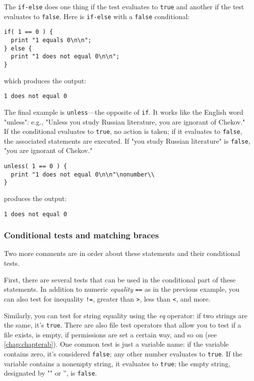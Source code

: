 The \verb|if-else| does one thing if the test evaluates to \verb|true| and another if the test evaluates to \verb|false|. Here is \verb|if-else| with a \verb|false| conditional: 

\begin{lstlisting}
if( 1 == 0 ) {
  print "1 equals 0\n\n";
} else {
  print "1 does not equal 0\n\n";
}
\end{lstlisting}

which produces the output:

\begin{lstlisting}
1 does not equal 0
\end{lstlisting}

The final example is \verb|unless|—the opposite of \verb|if|. It works like the English word "unless": e.g., "Unless you study Russian literature, you are ignorant of Chekov." If the conditional evaluates to \verb|true|, no action is taken; if it evaluates to \verb|false|, the associated statements are executed. If "you study Russian literature" is \verb|false|, "you are ignorant of Chekov." 

\begin{lstlisting}
unless( 1 == 0 ) {
  print "1 does not equal 0\n\n"\nonumber\\
}
\end{lstlisting}

produces the output:

\begin{lstlisting}
1 does not equal 0
\end{lstlisting}

\subsubsection{Conditional tests and matching braces}
Two more comments are in order about these statements and their conditional tests.

First, there are several tests that can be used in the conditional part of these statements. In addition to numeric \textit{equality} \verb|==| as in the previous example, you can also test for inequality \verb|!=|, greater than \verb|>|, less than \verb|<|, and more.

Similarly, you can test for string equality using the \textit{eq} operator: if two strings are the same, it's \verb|true|. There are also file test operators that allow you to test if a file exists, is empty, if permissions are set a certain way, and so on (see \autoref{chap:chapterab}). One common test is just a variable name: if the variable contains zero, it's considered \verb|false|; any other number evaluates to \verb|true|. If the variable contains a nonempty string, it evaluates to \verb|true|; the empty string, designated by "" or '', is \verb|false|.

